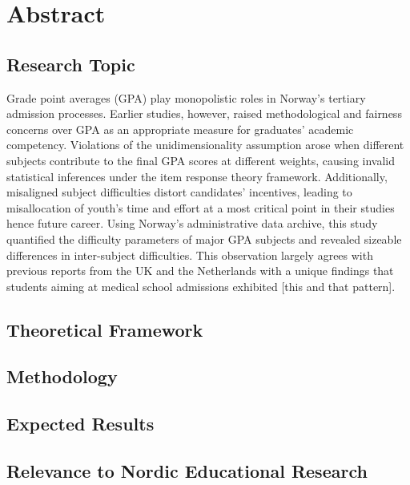 \section{Abstract}


\subsection{Research Topic}

Grade point averages (GPA) play monopolistic roles in Norway's tertiary admission processes. Earlier studies, however, raised methodological and fairness concerns over GPA as an appropriate measure for graduates' academic competency. Violations of the unidimensionality assumption arose when different subjects contribute to the final GPA scores at different weights, causing invalid statistical inferences under the item response theory framework. Additionally, misaligned subject difficulties distort candidates' incentives, leading to misallocation of youth's time and effort at a most critical point in their studies hence future career. Using Norway's administrative data archive, this study quantified the difficulty parameters of major GPA subjects and revealed sizeable differences in inter-subject difficulties. This observation largely agrees with previous reports from the UK and the Netherlands with a unique findings that students aiming at medical school admissions exhibited [this and that pattern].

\subsection{Theoretical Framework}

\subsection{Methodology}

\subsection{Expected Results}

\subsection{Relevance to Nordic Educational Research}